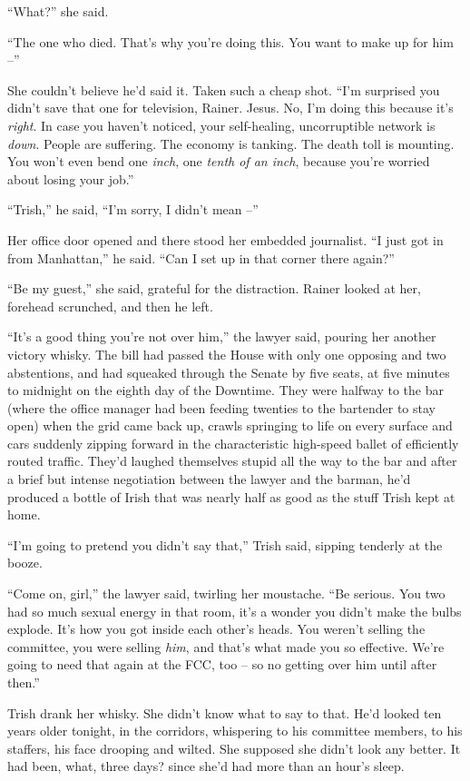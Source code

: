 “What?” she said.

“The one who died. That's why you're doing this. You want to make up 
for him --”

She couldn't believe he'd said it. Taken such a cheap shot. “I'm 
surprised you didn't save that one for television, Rainer. Jesus. No, 
I'm doing this because it's \emph{right}. In case you haven't noticed, 
your self-healing, uncorruptible network is \emph{down}. People are 
suffering. The economy is tanking. The death toll is mounting. You 
won't even bend one \emph{inch}, one \emph{tenth of an inch}, because 
you're worried about losing your job.”

“Trish,” he said, “I'm sorry, I didn't mean --”

Her office door opened and there stood her embedded journalist. “I 
just got in from Manhattan,” he said. “Can I set up in that corner 
there again?”

“Be my guest,” she said, grateful for the distraction. Rainer 
looked at her, forehead scrunched, and then he left.

\tb

“It's a good thing you're not over him,” the lawyer said, pouring 
her another victory whisky. The bill had passed the House with only one 
opposing and two abstentions, and had squeaked through the Senate by 
five seats, at five minutes to midnight on the eighth day of the 
Downtime. They were halfway to the bar (where the office manager had 
been feeding twenties to the bartender to stay open) when the grid came 
back up, crawls springing to life on every surface and cars suddenly 
zipping forward in the characteristic high-speed ballet of efficiently 
routed traffic. They'd laughed themselves stupid all the way to the bar 
and after a brief but intense negotiation between the lawyer and the 
barman, he'd produced a bottle of Irish that was nearly half as good as 
the stuff Trish kept at home.

“I'm going to pretend you didn't say that,” Trish said, sipping 
tenderly at the booze.

“Come on, girl,” the lawyer said, twirling her moustache. “Be 
serious. You two had so much sexual energy in that room, it's a wonder 
you didn't make the bulbs explode. It's how you got inside each other's 
heads. You weren't selling the committee, you were selling \emph{him}, 
and that's what made you so effective. We're going to need that again 
at the FCC, too -- so no getting over him until after then.”

Trish drank her whisky. She didn't know what to say to that. He'd 
looked ten years older tonight, in the corridors, whispering to his 
committee members, to his staffers, his face drooping and wilted. She 
supposed she didn't look any better. It had been, what, three days? 
since she'd had more than an hour's sleep.

